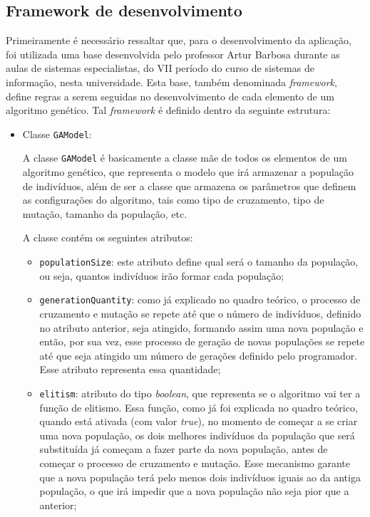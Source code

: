 \subsection{Framework de desenvolvimento} \label{framework_section}
\par Primeiramente é necessário ressaltar que, para o desenvolvimento da aplicação, foi utilizada uma base desenvolvida pelo professor Artur Barbosa durante as aulas de sistemas especialistas, do VII período do curso de sistemas de informação, nesta universidade.
Esta base, também denominada \textit{framework}, define regras a serem seguidas no desenvolvimento de cada elemento
de um algoritmo genético. Tal \textit{framework} é definido dentro da seguinte estrutura:

\begin{itemize}
	
	\item Classe \texttt{GAModel}:
	\par A classe \texttt{GAModel} é basicamente a classe mãe de todos os elementos de um algoritmo genético, 
	que representa o modelo que irá armazenar a população de indivíduos, além de ser
	a classe que armazena os parâmetros que definem as configurações do algoritmo, tais como tipo de cruzamento, tipo de mutação, 
	tamanho da população, etc.
	
	\par A classe contém os seguintes atributos:
	
	\begin{itemize} 
		\item \texttt{populationSize}:
		este atributo define qual será o tamanho da população, ou seja, quantos
		indivíduos irão formar cada população;
		
		\item \texttt{generationQuantity}:
		como já explicado no quadro teórico, o processo de cruzamento e mutação se
		repete até que o número de indivíduos, definido no atributo anterior, seja atingido, formando assim uma nova população e então, por sua vez, esse processo de geração de novas populações se repete até que seja atingido um número de gerações definido 
		pelo programador. Esse atributo representa essa quantidade;
		
		\item \texttt{elitism}:
		atributo do tipo \textit{boolean}, que representa se o algoritmo vai ter a
		função de elitismo.
		Essa função, como já foi explicada no quadro teórico, quando está ativada (com
		valor \textit{true}), no momento de começar a se criar uma nova população, os dois melhores indivíduos da população que será 
		substituída já começam a fazer parte da nova população, antes de começar o processo de cruzamento e mutação. 
		Esse mecanismo garante que a nova população terá pelo menos dois indivíduos iguais ao da antiga população, o que irá 
		impedir que a nova população não seja pior que a anterior;
		

\end{itemize}
\end{itemize}
